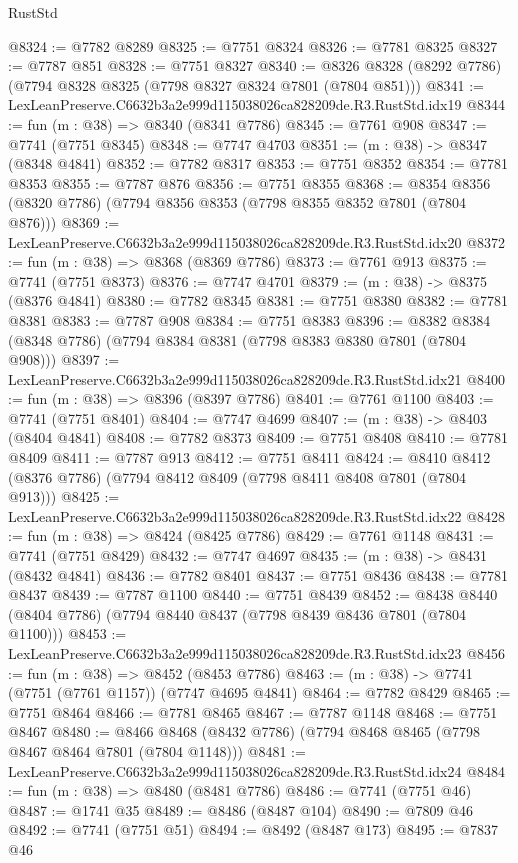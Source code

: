 \begin{lexlean}{RustStd}
\begin{coremodule}
@8324 := @7782 @8289
@8325 := @7751 @8324
@8326 := @7781 @8325
@8327 := @7787 @851
@8328 := @7751 @8327
@8340 := @8326 @8328 (@8292 @7786) (@7794 @8328 @8325 (@7798 @8327 @8324 @7801 (@7804 @851)))
@8341 := LexLeanPreserve.C6632b3a2e999d115038026ca828209de.R3.RustStd.idx19
@8344 := fun (m : @38) => @8340 (@8341 @7786)
@8345 := @7761 @908
@8347 := @7741 (@7751 @8345)
@8348 := @7747 @4703
@8351 := (m : @38) -> @8347 (@8348 @4841)
@8352 := @7782 @8317
@8353 := @7751 @8352
@8354 := @7781 @8353
@8355 := @7787 @876
@8356 := @7751 @8355
@8368 := @8354 @8356 (@8320 @7786) (@7794 @8356 @8353 (@7798 @8355 @8352 @7801 (@7804 @876)))
@8369 := LexLeanPreserve.C6632b3a2e999d115038026ca828209de.R3.RustStd.idx20
@8372 := fun (m : @38) => @8368 (@8369 @7786)
@8373 := @7761 @913
@8375 := @7741 (@7751 @8373)
@8376 := @7747 @4701
@8379 := (m : @38) -> @8375 (@8376 @4841)
@8380 := @7782 @8345
@8381 := @7751 @8380
@8382 := @7781 @8381
@8383 := @7787 @908
@8384 := @7751 @8383
@8396 := @8382 @8384 (@8348 @7786) (@7794 @8384 @8381 (@7798 @8383 @8380 @7801 (@7804 @908)))
@8397 := LexLeanPreserve.C6632b3a2e999d115038026ca828209de.R3.RustStd.idx21
@8400 := fun (m : @38) => @8396 (@8397 @7786)
@8401 := @7761 @1100
@8403 := @7741 (@7751 @8401)
@8404 := @7747 @4699
@8407 := (m : @38) -> @8403 (@8404 @4841)
@8408 := @7782 @8373
@8409 := @7751 @8408
@8410 := @7781 @8409
@8411 := @7787 @913
@8412 := @7751 @8411
@8424 := @8410 @8412 (@8376 @7786) (@7794 @8412 @8409 (@7798 @8411 @8408 @7801 (@7804 @913)))
@8425 := LexLeanPreserve.C6632b3a2e999d115038026ca828209de.R3.RustStd.idx22
@8428 := fun (m : @38) => @8424 (@8425 @7786)
@8429 := @7761 @1148
@8431 := @7741 (@7751 @8429)
@8432 := @7747 @4697
@8435 := (m : @38) -> @8431 (@8432 @4841)
@8436 := @7782 @8401
@8437 := @7751 @8436
@8438 := @7781 @8437
@8439 := @7787 @1100
@8440 := @7751 @8439
@8452 := @8438 @8440 (@8404 @7786) (@7794 @8440 @8437 (@7798 @8439 @8436 @7801 (@7804 @1100)))
@8453 := LexLeanPreserve.C6632b3a2e999d115038026ca828209de.R3.RustStd.idx23
@8456 := fun (m : @38) => @8452 (@8453 @7786)
@8463 := (m : @38) -> @7741 (@7751 (@7761 @1157)) (@7747 @4695 @4841)
@8464 := @7782 @8429
@8465 := @7751 @8464
@8466 := @7781 @8465
@8467 := @7787 @1148
@8468 := @7751 @8467
@8480 := @8466 @8468 (@8432 @7786) (@7794 @8468 @8465 (@7798 @8467 @8464 @7801 (@7804 @1148)))
@8481 := LexLeanPreserve.C6632b3a2e999d115038026ca828209de.R3.RustStd.idx24
@8484 := fun (m : @38) => @8480 (@8481 @7786)
@8486 := @7741 (@7751 @46)
@8487 := @1741 @35
@8489 := @8486 (@8487 @104)
@8490 := @7809 @46
@8492 := @7741 (@7751 @51)
@8494 := @8492 (@8487 @173)
@8495 := @7837 @46

\end{coremodule}
\end{lexlean}
